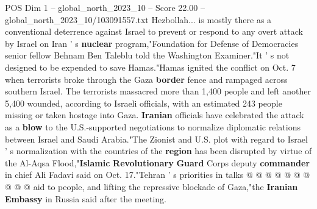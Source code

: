 \begin{textsample}{POS Dim 1 – global\_north\_2023\_10 – Score 22.00 – global\_north\_2023\_10/103091557.txt}
Hezbollah... is mostly there as a conventional deterrence against Israel to prevent or respond to any overt attack by Israel on Iran ' s \textbf{nuclear} program,"Foundation for Defense of Democracies senior fellow Behnam Ben Taleblu told the Washington Examiner."It ' s not designed to be expended to save Hamas."Hamas ignited the conflict on Oct. 7 when terrorists broke through the Gaza \textbf{border} fence and rampaged across southern Israel.
The terrorists massacred more than 1,400 people and left another 5,400 wounded, according to Israeli officials, with an estimated 243 people missing or taken hostage into Gaza. \textbf{Iranian} officials have celebrated the attack as a \textbf{blow} to the U.S.-supported negotiations to normalize diplomatic relations between Israel and Saudi Arabia."The Zionist and U.S. plot with regard to Israel ' s normalization with the countries of the \textbf{region} has been disrupted by virtue of the Al-Aqsa Flood,"\textbf{Islamic} \textbf{Revolutionary} \textbf{Guard} Corps deputy \textbf{commander} in chief Ali Fadavi said on Oct. 17."Tehran ' s priorities in talks @ @ @ @ @ @ @ @ @ @ aid to people, and lifting the repressive blockade of Gaza,"the \textbf{Iranian} \textbf{Embassy} in Russia said after the meeting.

\end{textsample}
